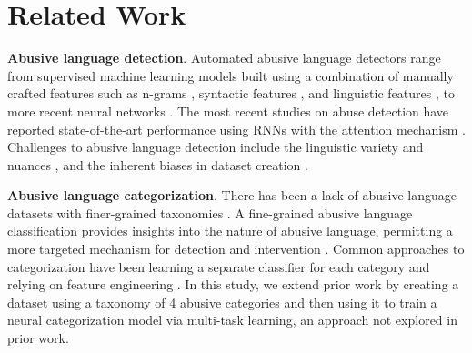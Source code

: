 \documentclass[letterpaper]{article} %
\begin{document}
\section{Related Work}
\label{sec:related}

\noindent\textbf{Abusive language detection}. Automated abusive language detectors range from supervised machine learning models built using a combination of manually crafted features such as n-grams \cite{wulczyn2017ex}, syntactic features \cite{nobata2016abusive}, and linguistic features \cite{yin2009detection,joksimovic2019automated}, to more recent neural networks \cite{park2017one,maity2018opinion}.
{The most recent studies on abuse detection have reported  state-of-the-art performance using RNNs with the attention mechanism  \cite{pavlopoulos2017deeper,chakrabarty2019pay}.} Challenges to abusive language detection include the linguistic variety and nuances \cite{nobata2016abusive,schmidt2017survey},  and the inherent biases in dataset creation \cite{vidgen2019challenges}.

\noindent\textbf{Abusive language categorization}. There has been a lack of abusive language datasets with finer-grained taxonomies \cite{park2017one,badjatiya2017deep,fortuna2018survey}. A fine-grained abusive language classification provides insights into the nature of abusive language, permitting a more targeted mechanism for detection and intervention \cite{hoff2009cyberbullying}.
 Common approaches to categorization  have been learning a separate classifier for each category and relying on feature engineering \cite{van2015detection,dinakar2011modeling}. In this study, we  extend prior work by creating a dataset using a taxonomy of 4 abusive categories and then using it to train a neural categorization model via multi-task learning, an approach not explored in prior work.
\end{document}
